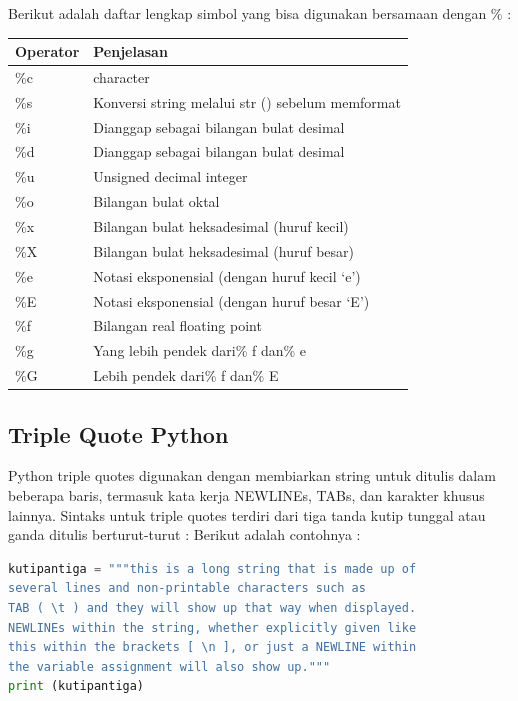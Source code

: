 Berikut adalah daftar lengkap simbol yang bisa digunakan bersamaan dengan \% :
\begin{center}
\begin{tabular}{ | m{2cm} | m{5cm} | }
\hline
Operator & Penjelasan \\
\hline
\%c & character \\
\hline
\%s & Konversi string melalui str () sebelum memformat \\
\hline
\%i & Dianggap sebagai bilangan bulat desimal \\
\hline
\%d & Dianggap sebagai bilangan bulat desimal \\
\hline
\%u & Unsigned decimal integer \\
\hline
\%o & Bilangan bulat oktal \\
\hline
\%x & Bilangan bulat heksadesimal (huruf kecil) \\
\hline
\%X & Bilangan bulat heksadesimal (huruf besar) \\
\hline
\%e & Notasi eksponensial (dengan huruf kecil ‘e’) \\
\hline
\%E & Notasi eksponensial (dengan huruf besar ‘E’) \\
\hline
\%f & Bilangan real floating point \\
\hline
\%g & Yang lebih pendek dari\% f dan\% e \\
\hline
\%G & Lebih pendek dari\% f dan\% E \\
\hline
\end{tabular}
\end{center}

\subsection{Triple Quote Python}
Python triple quotes digunakan dengan membiarkan string untuk ditulis dalam beberapa baris, termasuk kata kerja NEWLINEs, TABs, dan karakter khusus lainnya. Sintaks untuk triple quotes terdiri dari tiga tanda kutip tunggal atau ganda ditulis berturut-turut : Berikut adalah contohnya :
\begin{lstlisting}[language=Python]
kutipantiga = """this is a long string that is made up of
several lines and non-printable characters such as
TAB ( \t ) and they will show up that way when displayed.
NEWLINEs within the string, whether explicitly given like
this within the brackets [ \n ], or just a NEWLINE within
the variable assignment will also show up."""
print (kutipantiga)
\end{lstlisting}

